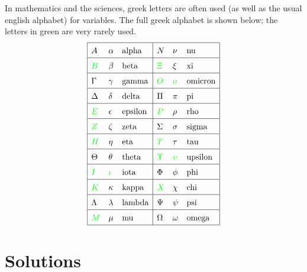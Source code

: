 \documentclass[a4paper]{book}
\theoremstyle{definition}
\begin{document}
In mathematics and the sciences, greek letters are often used (as well
as the usual english alphabet) for variables.  The full greek alphabet
is shown below; the letters in green are very rarely used.
\[ \renewcommand{\arraystretch}{1.5} \begin{array}{|lll|lll|}
 \hline
 A   & \alpha   & \text{alpha}    &
  N      & \nu      & \text{nu}       \\ \hline
 \GREEN{B}    & \beta    & \text{beta}     &
  \GREEN{\Xi}      & \xi      & \text{xi}       \\ \hline
 \Gamma   & \gamma   & \text{gamma}    &
  \GREEN{O} & \GREEN{o} & \text{omicron}  \\ \hline
 \Delta   & \delta   & \text{delta}    &
  \Pi      & \pi      & \text{pi}       \\ \hline
 \GREEN{E} & \epsilon & \text{epsilon}  &
  \GREEN{P}     & \rho     & \text{rho}      \\ \hline
 \GREEN{Z}    & \zeta    & \text{zeta}     &
  \Sigma   & \sigma   & \text{sigma}    \\ \hline
 \GREEN{H}     & \eta     & \text{eta}      &
  \GREEN{T}     & \tau     & \text{tau}      \\ \hline
 \Theta   & \theta   & \text{theta}    &
  \GREEN{\Upsilon} & \GREEN{\upsilon} & \text{upsilon}  \\ \hline
 \GREEN{I}    & \GREEN{\iota}    & \text{iota}     &
  \Phi     & \phi     & \text{phi}      \\ \hline
 \GREEN{K}   & \kappa   & \text{kappa}    &
  \GREEN{X}     & \chi     & \text{chi}      \\ \hline
 \Lambda  & \lambda  & \text{lambda}   &
  \Psi     & \psi     & \text{psi}      \\ \hline
 \GREEN{M}      & \mu      & \text{mu}       &
  \Omega   & \omega   & \text{omega}    \\ \hline
\end{array} \]

\chapter{Solutions}
\label{apx-solutions}



\closegraphsfile
\end{document}

